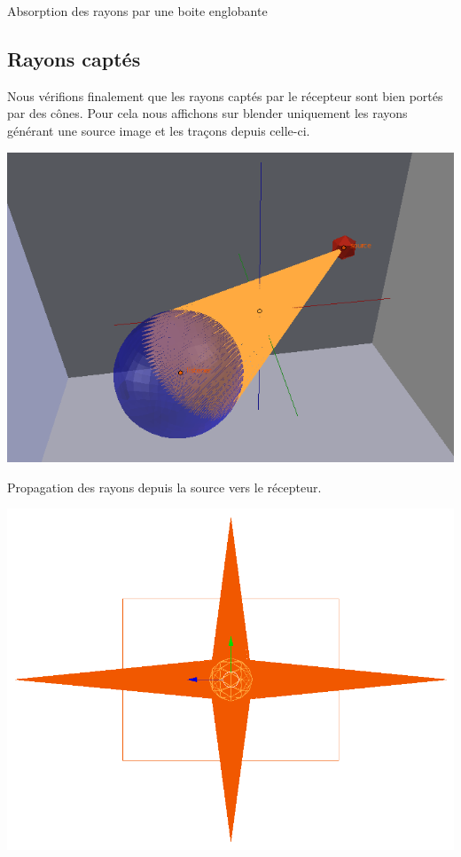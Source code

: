 \begin{figureth}
\begin{subfigureth}{0.45\textwidth}
	\end{subfigureth}
	\caption{Absorption des rayons par une boite englobante}
	\label{testBE}
\end{figureth}

\subsection{Rayons captés}
Nous vérifions finalement que les rayons captés par le récepteur sont bien portés par des cônes. Pour cela nous affichons sur blender uniquement les rayons générant une source image et les traçons depuis celle-ci.

\begin{figureth}
	\begin{subfigureth}{0.45\textwidth}
		\includegraphics[width=\linewidth]{images/testBeam}
		\caption{Propagation des rayons depuis la source vers le récepteur.}
		\label{testBeam}
	\end{subfigureth}
	\quad
	\begin{subfigureth}{0.45\textwidth}
		\includegraphics[width=\linewidth]{images/testBeam2}

\end{subfigureth}
\end{figureth}
